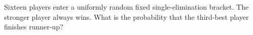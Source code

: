Sixteen players enter a uniformly random fixed single-elimination bracket. The stronger player always wins. What is the probability that the third-best player finishes runner-up?
